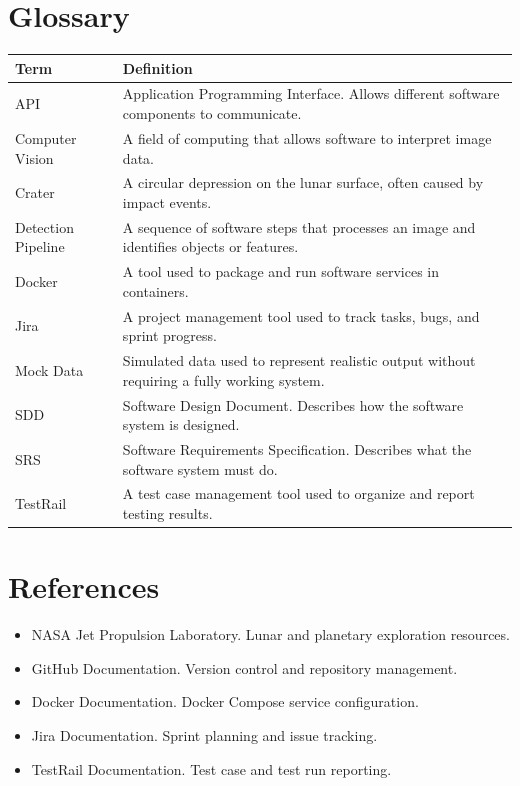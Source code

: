 \documentclass[12pt]{article}
\begin{document}
\section{Glossary}

\begin{longtable}{|p{1.5in}|p{4.5in}|}
\hline
\textbf{Term} & \textbf{Definition} \\
\hline
API & Application Programming Interface. Allows different software components to communicate. \\
\hline
Computer Vision & A field of computing that allows software to interpret image data. \\
\hline
Crater & A circular depression on the lunar surface, often caused by impact events. \\
\hline
Detection Pipeline & A sequence of software steps that processes an image and identifies objects or features. \\
\hline
Docker & A tool used to package and run software services in containers. \\
\hline
Jira & A project management tool used to track tasks, bugs, and sprint progress. \\
\hline
Mock Data & Simulated data used to represent realistic output without requiring a fully working system. \\
\hline
SDD & Software Design Document. Describes how the software system is designed. \\
\hline
SRS & Software Requirements Specification. Describes what the software system must do. \\
\hline
TestRail & A test case management tool used to organize and report testing results. \\
\hline
\end{longtable}

\section{References}

\begin{itemize}
    \item NASA Jet Propulsion Laboratory. Lunar and planetary exploration resources.
    \item GitHub Documentation. Version control and repository management.
    \item Docker Documentation. Docker Compose service configuration.
    \item Jira Documentation. Sprint planning and issue tracking.
    \item TestRail Documentation. Test case and test run reporting.
\end{itemize}
\end{document}
